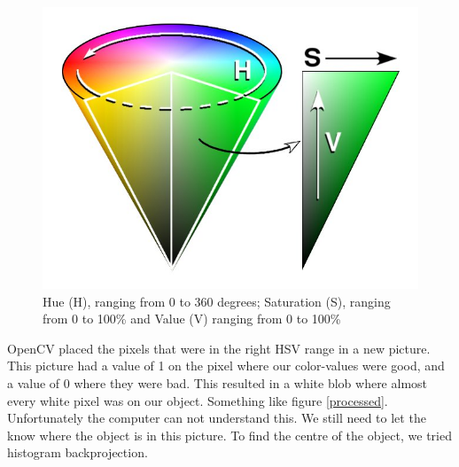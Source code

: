\begin{figure}
  \centering
      \includegraphics[scale=0.35]{HSV.jpg}
  \caption{Hue (H), ranging from 0 to 360 degrees; Saturation (S), ranging from 0 to 100\% and Value (V) ranging from 0 to 100\% }
  \label{HSV}
\end{figure}

OpenCV placed the pixels that were in the right HSV range in a new picture. This picture had a value of 1 on the pixel where our color-values were good, and a value of 0 where they were bad. This resulted in a white blob where almost every white pixel was on our object. Something like figure \ref{processed}. Unfortunately the computer can not understand this. We still need to let the \Ardrone know where the object is in this picture. To find the centre of the object, we tried histogram backprojection.

